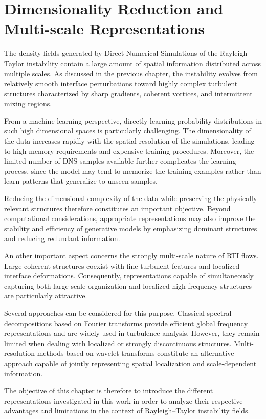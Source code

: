 \section{Dimensionality Reduction and Multi-scale Representations}

The density fields generated by Direct Numerical Simulations of the Rayleigh--Taylor instability contain a large amount of spatial information distributed across multiple scales. As discussed in the previous chapter, the instability evolves from relatively smooth interface perturbations toward highly complex turbulent structures characterized by sharp gradients, coherent vortices, and intermittent mixing regions.

From a machine learning perspective, directly learning probability distributions in such high dimensional spaces is particularly challenging. The dimensionality of the data increases rapidly with the spatial resolution of the simulations, leading to high memory requirements and expensive training procedures. Moreover, the limited number of DNS samples available further complicates the learning process, since the model may tend to memorize the training examples rather than learn patterns that generalize to unseen samples.

Reducing the dimensional complexity of the data while preserving the physically relevant structures therefore constitutes an important objective. Beyond computational considerations, appropriate representations may also improve the stability and efficiency of generative models by emphasizing dominant structures and reducing redundant information.

An other important aspect concerns the strongly multi-scale nature of RTI flows. Large coherent structures coexist with fine turbulent features and localized interface deformations. Consequently, representations capable of simultaneously capturing both large-scale organization and localized high-frequency structures are particularly attractive.

Several approaches can be considered for this purpose. Classical spectral decompositions based on Fourier transforms provide efficient global frequency representations and are widely used in turbulence analysis. However, they remain limited when dealing with localized or strongly discontinuous structures. Multi-resolution methods based on wavelet transforms constitute an alternative approach capable of jointly representing spatial localization and scale-dependent information.

The objective of this chapter is therefore to introduce the different representations investigated in this work in order to analyze their respective advantages and limitations in the context of Rayleigh--Taylor instability fields.

